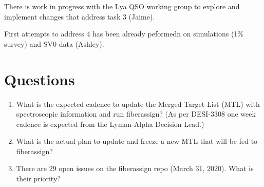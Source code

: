 \documentclass{article}
\begin{document}
There is work in progress with the Lya QSO working group to explore
and implement changes that address task 3 (Jaime).

First attempts to address 4 has been already peformedn on simulations
(1\% survey) and SV0 data (Ashley).  
 
\section*{Questions}

\begin{enumerate}
\item What is the expected cadence to update the Merged Target List
  (MTL) with spectroscopic information and run fiberassign? (As per
  DESI-3308 one week cadence is expected from the Lyman-Alpha Decision
  Lead.) 
\item What is the actual plan to update and freeze a new MTL that
  will be fed to fiberassign?
\item There are 29 open issues on the fiberassign repo (March 31,
  2020). What is their priority?
\end{enumerate}
\end{document}

